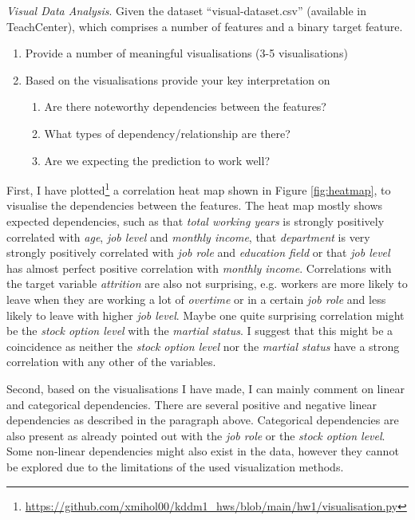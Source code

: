 \documentclass[a4paper,10pt]{article}\setlength{\textheight}{10in}\setlength{\textwidth}{6.5in}\setlength{\topmargin}{-0.125in}\setlength{\oddsidemargin}{-.2in}\setlength{\evensidemargin}{-.2in}\setlength{\headsep}{0.2in}\setlength{\footskip}{0pt}\usepackage{amsmath}\usepackage{fancyhdr}\usepackage{enumitem}\usepackage{hyperref}\usepackage{xcolor}\usepackage{graphicx}\pagestyle{fancy}
\begin{document}
\begin{enumerate}[topsep=0mm, partopsep=0mm, leftmargin=*]

{\color{blue}
\item\textit{Visual Data Analysis}. Given the dataset ``visual-dataset.csv'' (available in TeachCenter), which comprises a number of features and a binary target feature.
\begin{enumerate}
	\item Provide a number of meaningful visualisations (3-5 visualisations)
	\item Based on the visualisations provide your key interpretation on
	\begin{enumerate}
		\item Are there noteworthy dependencies between the features?
		\item What types of dependency/relationship are there?
		\item Are we expecting the prediction to work well?
	\end{enumerate}
\end{enumerate}
}

First, I have plotted\footnote{\url{https://github.com/xmihol00/kddm1_hws/blob/main/hw1/visualisation.py}} a correlation heat map shown in Figure \ref{fig:heatmap}, to visualise the dependencies between the features. The heat map mostly shows expected dependencies, such as that \textit{total working years} is strongly positively correlated with \textit{age}, \textit{job level} and \textit{monthly income}, that \textit{department} is very strongly positively correlated with \textit{job role} and \textit{education field} or that \textit{job level} has almost perfect positive correlation with \textit{monthly income}. Correlations with the target variable \textit{attrition} are also not surprising, e.g. workers are more likely to leave when they are working a lot of \textit{overtime} or in a certain \textit{job role} and less likely to leave with higher \textit{job level}. Maybe one quite surprising correlation might be the \textit{stock option level} with the \textit{martial status}. I suggest that this might be a coincidence as neither the \textit{stock option level} nor the \textit{martial status} have a strong correlation with any other of the variables. 

Second, based on the visualisations I have made, I can mainly comment on linear and categorical dependencies. There are several positive and negative linear dependencies as described in the paragraph above. Categorical dependencies are also present as already pointed out with the \textit{job role} or the \textit{stock option level}. Some non-linear dependencies might also exist in the data, however they cannot be explored due to the limitations of the used visualization methods.


\end{enumerate}
\end{document}
